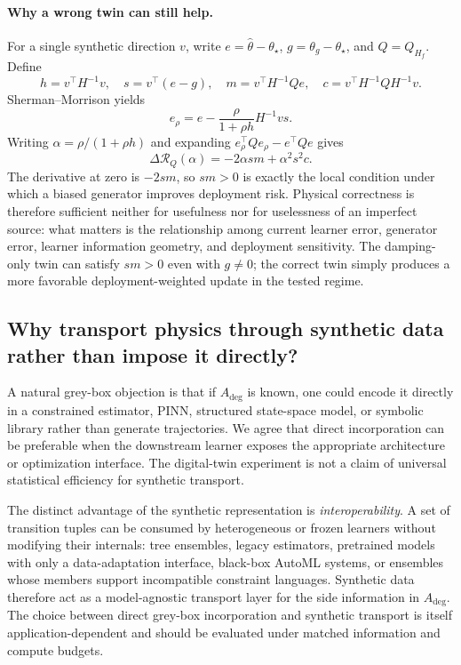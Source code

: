 \paragraph{Why a wrong twin can still help.}
For a single synthetic direction $v$, write $e=\widehat\theta-\theta_\star$, $g=\theta_g-\theta_\star$, and $Q=Q_{H_f}$. Define
\[
h=v^\top H^{-1}v,\quad s=v^\top(e-g),\quad
m=v^\top H^{-1}Qe,\quad
c=v^\top H^{-1}QH^{-1}v.
\]
Sherman--Morrison yields
\[
e_\rho=e-\frac{\rho}{1+\rho h}H^{-1}vs.
\]
Writing $\alpha=\rho/(1+\rho h)$ and expanding $e_\rho^\top Qe_\rho-e^\top Qe$ gives
\[
\Delta\mathcal R_Q(\alpha)
=-2\alpha sm+\alpha^2s^2c.
\]
The derivative at zero is $-2sm$, so $sm>0$ is exactly the local condition under which a biased generator improves deployment risk. Physical correctness is therefore sufficient neither for usefulness nor for uselessness of an imperfect source: what matters is the relationship among current learner error, generator error, learner information geometry, and deployment sensitivity. The damping-only twin can satisfy $sm>0$ even with $g\neq0$; the correct twin simply produces a more favorable deployment-weighted update in the tested regime.

\subsection{Why transport physics through synthetic data rather than impose it directly?}\label{app:greybox}
A natural grey-box objection is that if $A_{\mathrm{deg}}$ is known, one could encode it directly in a constrained estimator, PINN, structured state-space model, or symbolic library rather than generate trajectories. We agree that direct incorporation can be preferable when the downstream learner exposes the appropriate architecture or optimization interface. The digital-twin experiment is not a claim of universal statistical efficiency for synthetic transport.

The distinct advantage of the synthetic representation is \emph{interoperability}. A set of transition tuples can be consumed by heterogeneous or frozen learners without modifying their internals: tree ensembles, legacy estimators, pretrained models with only a data-adaptation interface, black-box AutoML systems, or ensembles whose members support incompatible constraint languages. Synthetic data therefore act as a model-agnostic transport layer for the side information in $A_{\mathrm{deg}}$. The choice between direct grey-box incorporation and synthetic transport is itself application-dependent and should be evaluated under matched information and compute budgets.

